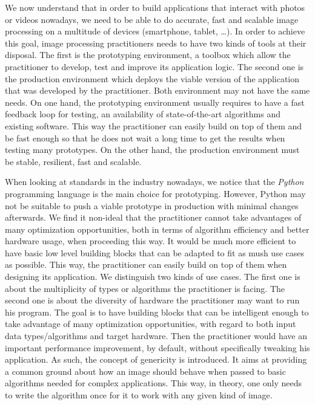 We now understand that in order to build applications that interact with photos or videos nowadays, we need to be able
to do accurate, fast and scalable image processing on a multitude of devices (smartphone, tablet, \ldots). In order to
achieve this goal, image processing practitioners needs to have two kinds of tools at their disposal. The first is the
prototyping environment, a toolbox which allow the practitioner to develop, test and improve its application logic. The
second one is the production environment which deploys the viable version of the application that was developed by the
practitioner. Both environment may not have the same needs. On one hand, the prototyping environment usually requires to
have a fast feedback loop for testing, an availability of state-of-the-art algorithms and existing software. This way
the practitioner can easily build on top of them and be fast enough so that he does not wait a long time to get the
results when testing many prototypes. On the other hand, the production environment must be stable, resilient, fast and
scalable.

When looking at standards in the industry nowadays, we notice that the \emph{Python} programming language is the main
choice for prototyping. However, Python may not be suitable to push a viable prototype in production with minimal
changes afterwards. We find it non-ideal that the practitioner cannot take advantages of many optimization
opportunities, both in terms of algorithm efficiency and better hardware usage, when proceeding this way. It would be
much more efficient to have basic low level building blocks that can be adapted to fit as mush use cases as possible.
This way, the practitioner can easily build on top of them when designing its application. We distinguish two kinds of
use cases. The first one is about the multiplicity of types or algorithms the practitioner is facing. The second one is
about the diversity of hardware the practitioner may want to run his program. The goal is to have building blocks that
can be intelligent enough to take advantage of many optimization opportunities, with regard to both input data
types/algorithms and target hardware. Then the practitioner would have an important performance improvement, by default,
without specifically tweaking his application. As such, the concept of genericity is introduced. It aims at providing a
common ground about how an image should behave when passed to basic algorithms needed for complex applications. This
way, in theory, one only needs to write the algorithm once for it to work with any given kind of image.

